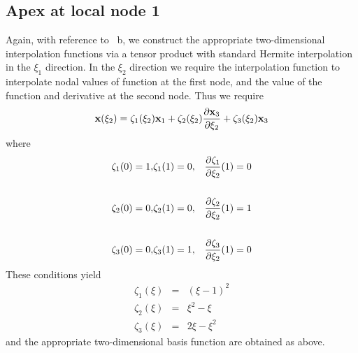 \subsection{Apex at local node 1}
Again, with reference to ~b, we construct the appropriate
two-dimensional interpolation functions via a tensor product with standard
Hermite interpolation in the $\xi_{1}$ direction.  In the $\xi_{2}$ direction
we require the interpolation function to interpolate nodal values of function
at the first node, and the value of the function and derivative at the second
node.  Thus we require
\begin{displaymath}
 {\bf x}(\xi_{2}) = \zeta_{1}(\xi_{2}){\bf x}_{1} + \zeta_{2}(\xi_{2}) 
   \dfrac{\partial {\bf x}_{3}}{\partial \xi_{2}}   + \zeta_{3}(\xi_{2}) {\bf x}_{3}
\end{displaymath}  
where   
\begin{eqnarray*}
 \zeta_{1} (0)= 1,&\zeta_{1} (1)=0,& \dfrac{\partial \zeta_{1}}{\partial \xi_{2}}  (1) = 0\\  \\
 \zeta_{2} (0)= 0,&\zeta_{2} (1)=0,& \dfrac{\partial \zeta_{2}}{\partial \xi_{2}} (1) = 1\\
 \\  
 \zeta_{3} (0)= 0,&\zeta_{3} (1)=1,& \dfrac{\partial \zeta_{3}}{\partial \xi_{2}}  (1) = 0
\end{eqnarray*}  
These conditions yield
\begin{eqnarray*}
 \zeta_{1} (\xi) & = & (\xi-1)^{2}\\ 
 \zeta_{2} (\xi) & = & \xi^{2} - \xi\\ 
 \zeta_{3} (\xi) & = & 2\xi-\xi^{2}
\end{eqnarray*} 
and the appropriate two-dimensional basis function are obtained as above.

